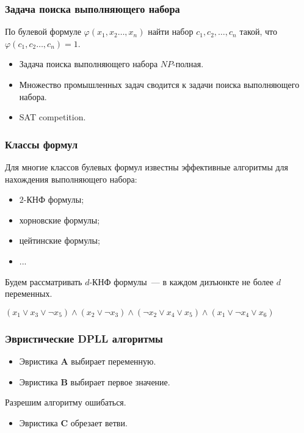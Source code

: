 \begin{frame}
    \frametitle{Задача поиска выполняющего набора}

    \pause
    \begin{task}
        По булевой формуле $\varphi(x_1, x_2 \dots, x_n)$ найти
        набор $c_1, c_2, \dots, c_n$ такой, что $\varphi(c_1, c_2
        \dots, c_n) = 1$.
    \end{task}

    \pause
    \begin{itemize}
        \item Задача поиска выполняющего набора $NP$-полная.
		\pause
    	\item Множество промышленных задач сводится к задачи поиска
		    выполняющего набора.
        \pause
        \item SAT competition.
    \end{itemize}
\end{frame}

\begin{frame}
    \frametitle{Классы формул}

    \pause
    Для многие классов булевых формул известны эффективные алгоритмы
    для нахождения выполняющего набора:
    \begin{itemize}
        \pause
 		\item $2$-КНФ формулы;
    	\pause
    	\item хорновские формулы;
	    \pause
    	\item цейтинские формулы;
    	\item ...
    \end{itemize}

    \pause
   	Будем рассматривать $d$-КНФ формулы~--- в каждом дизъюнкте не
    более $d$ переменных.
    
    \pause
    $(x_1 \vee x_3 \vee \neg x_5) \wedge (x_2 \vee \neg x_3) \wedge
    (\neg x_2 \vee x_4 \vee x_5) \wedge (x_1 \vee \neg x_4 \vee x_6)$
\end{frame}

\begin{frame}
	\frametitle{Эвристические DPLL алгоритмы}

   	
    
	\pause
    \pause
    \pause
    \pause
    \pause
    \begin{itemize}
        \item Эвристика $\mathbf{A}$ выбирает переменную.
    	\pause
	    \item Эвристика $\mathbf{B}$ выбирает первое значение.
    \end{itemize}

    \pause
    Разрешим алгоритму ошибаться.

    \pause
    \pause
    \begin{itemize}
	    \item Эвристика $\mathbf{C}$ обрезает ветви.
    \end{itemize}
\end{frame}

